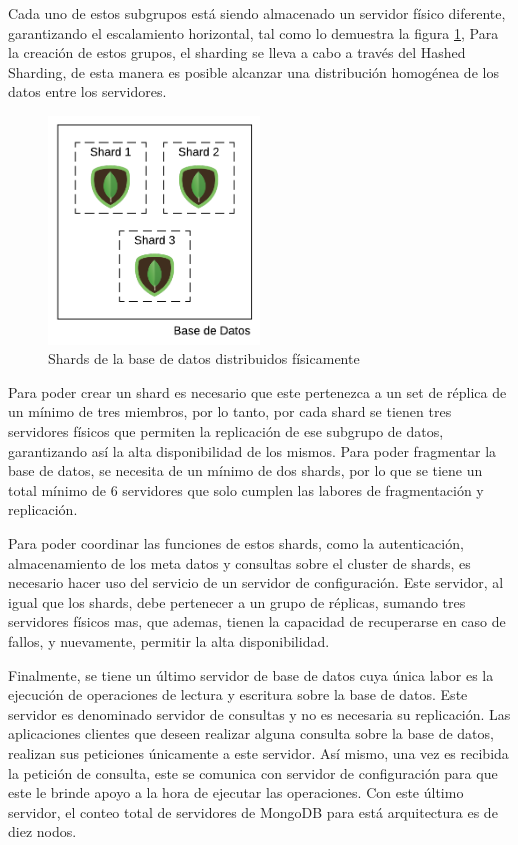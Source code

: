 Cada uno de estos subgrupos está siendo almacenado un servidor físico diferente, garantizando el escalamiento horizontal, tal como lo demuestra la figura \ref{fig:shards_distributed},
Para la creación de estos grupos, el sharding se lleva a cabo a través del Hashed Sharding, de esta manera es
posible alcanzar una distribución homogénea de los datos entre los servidores.

\begin{figure}[H]
	\centering
		\includegraphics[width=0.5\textwidth]{figures/shards_distributed}
	\caption{Shards de la base de datos distribuidos físicamente}
	\label{fig:shards_distributed}
\end{figure}

Para poder crear un shard es necesario que este pertenezca a un set de réplica de un mínimo de tres miembros,
por lo tanto, por cada shard se tienen tres servidores físicos que permiten la replicación de ese subgrupo de datos, garantizando
así la alta disponibilidad de los mismos.
Para poder fragmentar la base de datos, se necesita de un mínimo de dos shards, por lo que se tiene un total mínimo de 6 servidores
que solo cumplen las labores de fragmentación y replicación.

Para poder coordinar las funciones de estos shards, como la autenticación, almacenamiento de los meta datos y consultas sobre el cluster de shards,
es necesario hacer uso del servicio de un servidor de configuración.
Este servidor, al igual que los shards, debe pertenecer a un grupo de réplicas, sumando tres servidores físicos mas, que ademas,
tienen la capacidad de recuperarse en caso de fallos, y nuevamente, permitir la alta disponibilidad.

Finalmente, se tiene un último servidor de base de datos cuya única labor es la ejecución de operaciones de lectura y escritura sobre la base de datos.
Este servidor es denominado servidor de consultas y no es necesaria su replicación.
Las aplicaciones clientes que deseen realizar alguna consulta sobre la base de datos, realizan sus peticiones únicamente a este servidor.
Así mismo, una vez es recibida la petición de consulta, este se comunica con servidor de configuración para que este le brinde apoyo a la hora de ejecutar las operaciones.
Con este último servidor, el conteo total de servidores de MongoDB para está arquitectura es de diez nodos.

